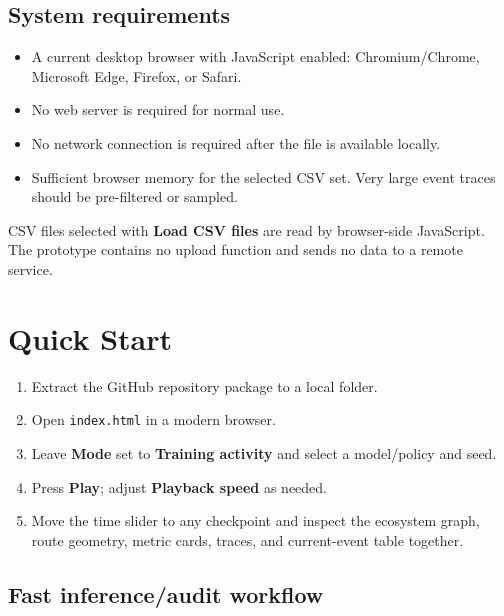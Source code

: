 \documentclass[11pt,a4paper]{article}
\newcommand{\ui}[1]{\textsf{\bfseries #1}}
\newcommand{\code}[1]{\texttt{#1}}
\begin{document}
\subsection{System requirements}

\begin{itemize}
  \item A current desktop browser with JavaScript enabled: Chromium/Chrome, Microsoft Edge, Firefox, or Safari.
  \item No web server is required for normal use.
  \item No network connection is required after the file is available locally.
  \item Sufficient browser memory for the selected CSV set. Very large event traces should be pre-filtered or sampled.
\end{itemize}

\begin{keybox}
CSV files selected with \ui{Load CSV files} are read by browser-side JavaScript. The prototype contains no upload function and sends no data to a remote service.
\end{keybox}

\section{Quick Start}

\begin{procedurebox}
\begin{enumerate}
  \item Extract the GitHub repository package to a local folder.
  \item Open \code{index.html} in a modern browser.
  \item Leave \ui{Mode} set to \ui{Training activity} and select a model/policy and seed.
  \item Press \ui{Play}; adjust \ui{Playback speed} as needed.
  \item Move the time slider to any checkpoint and inspect the ecosystem graph, route geometry, metric cards, traces, and current-event table together.
\end{enumerate}
\end{procedurebox}

\subsection{Fast inference/audit workflow}
\end{document}
